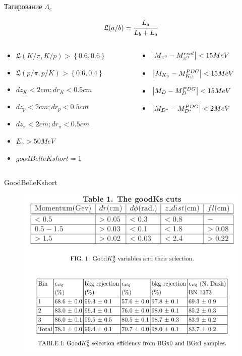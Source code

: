 \documentclass{beamer}
\newcommand{\inner}[1]{\left( #1 \right)}
\newcommand{\infig}[1]{\left\{ #1 \right\}}
\begin{document}
\begin{frame}{Тагирование $\Lambda_c$}

    \begin{equation*}
        \mathfrak L (a/b) = \cfrac{L_a}{L_b+L_a}
    \end{equation*}

    \begin{columns}
        \begin{column}{0.5\textwidth}
            \begin{itemize}
                \item $\mathfrak L \inner{K/\pi, K/p} > \infig{0.6, 0.6}$
                \item $\mathfrak L \inner{p/\pi, p/K} > \infig{0.6, 0.4}$
                \item $dz_{K} < 2 cm; dr_{K} < 0.5 cm$
                \item $dz_{p} < 2 cm; dr_{p} < 0.5 cm$
                \item $dz_{\pi} < 2 cm; dr_{\pi} < 0.5 cm$
                \item $E_{\gamma} > 50 MeV$
                \item $goodBelleKshort = 1$
            \end{itemize}
        \end{column}
        \begin{column}{0.5\textwidth}
            \begin{itemize}
                \item $\abs{M_{\pi^0} - M^{real}_{\pi^0}} < 15 MeV$
                \item $\abs{M_{K_S} - M^{PDG}_{K_S}} < 15 MeV$
                \item $\abs{M_{D} - M_{D}^{PDG}} < 15 MeV$
                \item $\abs{M_{D^*} - M_{D^*}^{PDG}} < 2 MeV$
            \end{itemize}
        \end{column}
    \end{columns}
\end{frame}

\begin{frame}{GoodBelleKshort}
    \begin{figure}[H]
        \centering
        \includegraphics[width=0.73\linewidth]{img/goodKshortcut.png}
    \end{figure}
\end{frame}
\end{document}

